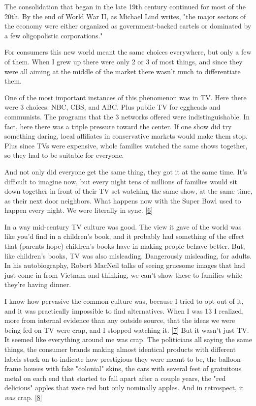 The consolidation that began in the late 19th century continued for
most of the 20th.  By the end of World War II, as Michael Lind
writes, "the major sectors of the economy were either organized
as government-backed cartels or dominated by a few oligopolistic
corporations."

For consumers this new world meant the same choices everywhere, but
only a few of them.  When I grew up there were only 2 or 3 of most
things, and since they were all aiming at the middle of the market
there wasn't much to differentiate them.

One of the most important instances of this phenomenon was in TV.
Here there were 3 choices: NBC, CBS, and ABC. Plus public TV for
eggheads and communists.  The programs that the 3 networks offered were
indistinguishable.  In fact, here there was a triple pressure toward
the center. If one show did try something daring, local affiliates
in conservative markets would make them stop. Plus since TVs were
expensive, whole families watched the same shows together, so they
had to be suitable for everyone.

And not only did everyone get the same thing, they got it at the
same time.  It's difficult to imagine now, but every night tens of
millions of families would sit down together in front of their TV
set watching the same show, at the same time, as their next door
neighbors.  What happens now with the Super Bowl used to happen
every night. We were literally in sync.
[\href{\#f6n}{6}]

In a way mid-century TV culture was good. The view it gave of the
world was like you'd find in a children's book, and it probably had
something of the effect that (parents hope) children's books have
in making people behave better.  But, like children's books, TV was
also misleading.  Dangerously misleading, for adults. In his
autobiography, Robert MacNeil talks of seeing gruesome images that
had just come in from Vietnam and thinking, we can't show these to
families while they're having dinner.

I know how pervasive the common culture was, because I tried to opt
out of it, and it was practically impossible to find alternatives.
When I was 13 I realized, more from internal evidence than any
outside source, that the ideas we were being fed on TV were crap,
and I stopped watching it.
[\href{\#f7n}{7}]
But it wasn't just TV.  It seemed
like everything around me was crap.  The politicians all saying the
same things, the consumer brands making almost identical products
with different labels stuck on to indicate how prestigious they
were meant to be, the balloon-frame houses with fake "colonial"
skins, the cars with several feet of gratuitous metal on each end
that started to fall apart after a couple years, the "red delicious"
apples that were red but only nominally 
apples. And in retrospect, it \emph{was} crap.
[\href{\#f8n}{8}]

